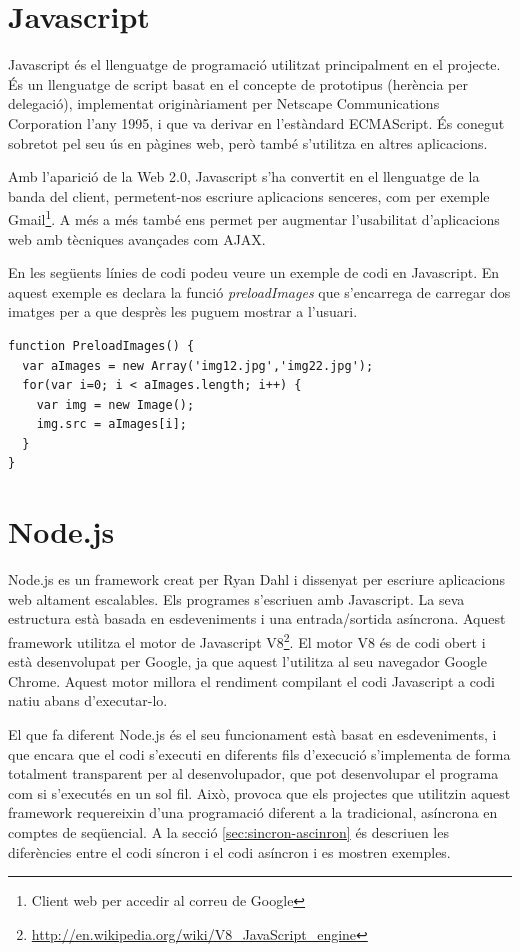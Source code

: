 \section{Javascript}

Javascript és el llenguatge de programació utilitzat principalment en el projecte. És un llenguatge de script basat en el concepte de prototipus (herència per delegació), implementat originàriament per Netscape Communications Corporation l'any 1995, i que va derivar en l'estàndard ECMAScript. És conegut sobretot pel seu ús en pàgines web, però també s'utilitza en altres aplicacions.

Amb l'aparició de la Web 2.0, Javascript s'ha convertit en el llenguatge de la banda del client, permetent-nos escriure aplicacions senceres, com per exemple Gmail\footnote{Client web per accedir al correu de Google}. A més a més també ens permet per augmentar l'usabilitat d'aplicacions web amb tècniques avançades com AJAX.


En les següents línies de codi podeu veure un exemple de codi en Javascript. En aquest exemple es declara la funció \emph{preloadImages} que s'encarrega de carregar dos imatges per a que desprès les puguem mostrar a l'usuari.
 
\begin{lstlisting}
function PreloadImages() {
  var aImages = new Array('img12.jpg','img22.jpg');
  for(var i=0; i < aImages.length; i++) {
    var img = new Image();
    img.src = aImages[i];
  }
}
\end{lstlisting}


\section{Node.js}
\label{sec:Node.js-min}
Node.js es un framework creat per Ryan Dahl i dissenyat per escriure aplicacions web altament escalables. Els programes s'escriuen amb Javascript. La seva estructura està basada en esdeveniments i una entrada/sortida asíncrona. Aquest framework utilitza el motor de Javascript V8\footnote{\url{http://en.wikipedia.org/wiki/V8_JavaScript_engine}}. El motor V8 és de codi obert i està desenvolupat per Google, ja que aquest l'utilitza al seu navegador Google Chrome. Aquest motor millora el rendiment compilant el codi Javascript a codi natiu abans d'executar-lo.

El que fa diferent Node.js és el seu funcionament està basat en esdeveniments, i que encara que el codi s'executi en diferents fils d'execució s'implementa de forma totalment transparent per al desenvolupador, que pot desenvolupar el programa com si s'executés en un sol fil. Això, provoca que els projectes que utilitzin aquest framework requereixin d'una programació diferent a la tradicional, asíncrona en comptes de seqüencial. A la secció \ref{sec:sincron-ascinron} és descriuen les diferències entre el codi síncron i el codi asíncron i es mostren exemples.

